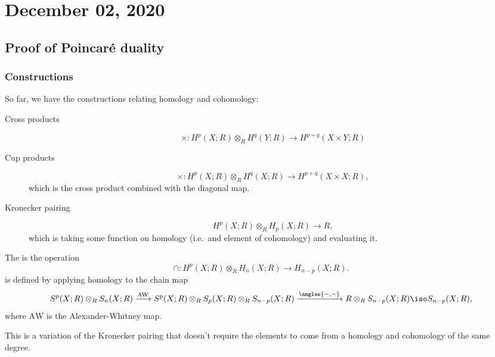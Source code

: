\documentclass{standalone}
\begin{document}
\chapter{December 02, 2020}
\section{Proof of Poincar\'e duality}
\subsection{Constructions}
So far, we have the constructions relating homology and cohomology:
\begin{description}
  \item[Cross products]
  \[
    \times \colon H^p(X; R) \otimes_R H^q(Y; R) \to H^{p+q}(X \times Y; R)
  \]
  
  \item[Cup products]
  \[
    \times \colon H^p(X; R) \otimes_R H^q(X; R) \to H^{p+q}(X \times X; R),
  \]
  which is the cross product combined with the diagonal map.

  \item[Kronecker pairing]
  \[
    H^p(X; R) \otimes_R H_p(X; R) \to R,
  \]
  which is taking some function on homology
  (i.e.\ and element of cohomology)
  and evaluating it.
\end{description}

\begin{definition}
  The  is the operation
  \[
    \cap \colon H^p(X; R) \otimes_R H_n(X; R) \to H_{n-p}(X; R).
  \]
  is defined by applying homology to the chain map
  \[
    S^p(X; R) \otimes_R S_n(X; R) \xrightarrow{\mathrm{AW}}
    S^p(X; R) \otimes_R S_p(X; R) \otimes_R S_{n-p}(X; R)
    \xrightarrow{\angles{-, -}} R \otimes_R S_{n-p}(X; R) \iso S_{n-p}(X; R),
  \]
  where \(\mathrm{AW}\) is the Alexander-Whitney map.
\end{definition}
This is a variation of the Kronecker pairing that doesn't require
the elements to come from a homology and cohomology of the same degree.
\end{document}
